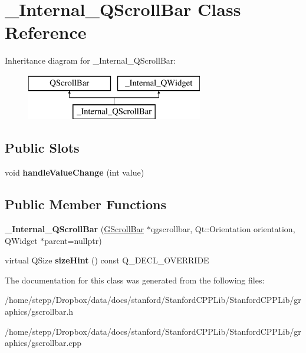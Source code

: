 \hypertarget{class__Internal__QScrollBar}{}\section{\+\_\+\+Internal\+\_\+\+Q\+Scroll\+Bar Class Reference}
\label{class__Internal__QScrollBar}
Inheritance diagram for \+\_\+\+Internal\+\_\+\+Q\+Scroll\+Bar\+:\begin{figure}[H]
\begin{center}
\leavevmode
\includegraphics[height=2.000000cm]{class__Internal__QScrollBar}
\end{center}
\end{figure}
\subsection*{Public Slots}
\begin{DoxyCompactItemize}
\item 
\mbox{\label{class__Internal__QScrollBar_a99ebbdaf071394f3b2638262f68fd235}} 
void {\bfseries handle\+Value\+Change} (int value)
\end{DoxyCompactItemize}
\subsection*{Public Member Functions}
\begin{DoxyCompactItemize}
\item 
\mbox{\label{class__Internal__QScrollBar_a01739c6bf4e355ddd9da2e7f203de9ff}} 
{\bfseries \+\_\+\+Internal\+\_\+\+Q\+Scroll\+Bar} (\mbox{\hyperlink{classGScrollBar}{G\+Scroll\+Bar}} $\ast$qgscrollbar, Qt\+::\+Orientation orientation, Q\+Widget $\ast$parent=nullptr)
\item 
\mbox{\label{class__Internal__QScrollBar_ad7de88e172a93c7f4e227f3376a92f6b}} 
virtual Q\+Size {\bfseries size\+Hint} () const Q\+\_\+\+D\+E\+C\+L\+\_\+\+O\+V\+E\+R\+R\+I\+DE
\end{DoxyCompactItemize}


The documentation for this class was generated from the following files\+:\begin{DoxyCompactItemize}
\item 
/home/stepp/\+Dropbox/data/docs/stanford/\+Stanford\+C\+P\+P\+Lib/\+Stanford\+C\+P\+P\+Lib/graphics/gscrollbar.\+h\item 
/home/stepp/\+Dropbox/data/docs/stanford/\+Stanford\+C\+P\+P\+Lib/\+Stanford\+C\+P\+P\+Lib/graphics/gscrollbar.\+cpp\end{DoxyCompactItemize}
